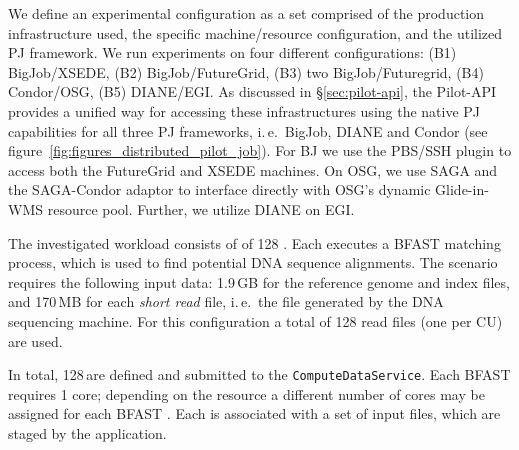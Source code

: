 \documentclass[conference]{IEEEtran}
\begin{document}
We define an experimental configuration as a set comprised of the
production infrastructure used, the specific machine/resource
configuration, and the utilized PJ framework.  We run experiments
on four different configurations: (B1) BigJob/XSEDE, (B2)
BigJob/FutureGrid, (B3) two BigJob/Futuregrid, (B4) Condor/OSG, (B5)
DIANE/EGI. As discussed in \S\ref{sec:pilot-api}, the Pilot-API
provides a unified way for accessing these infrastructures using the
native PJ capabilities for all three PJ frameworks, i.\,e.\ BigJob,
DIANE and Condor (see figure~\ref{fig:figures_distributed_pilot_job}).
For BJ we use the PBS/SSH plugin to access both the FutureGrid and
XSEDE machines.  On OSG, we use SAGA and the SAGA-Condor adaptor to
interface directly with OSG's dynamic Glide-in-WMS resource
pool. Further, we utilize DIANE on EGI.

The investigated workload consists of of 128 \cus. Each \cu executes a
BFAST matching process, which is used to find potential DNA sequence
alignments. The scenario requires the following input data: 1.9\,GB
for the reference genome and index files, and 170\,MB for each
\textit{short read} file, i.\,e.\ the file generated by the DNA
sequencing machine. For this configuration a total of 128 read files
(one per CU) are used.


In total, 128\,\cus are defined and submitted to the
\texttt{Compute\-Data\-Service}. Each BFAST \cu requires 1 core;
depending on the resource a different number of cores may be assigned
for each BFAST \cu. Each \cu is associated with a
set of input files, which are staged by the application.



\end{document}
